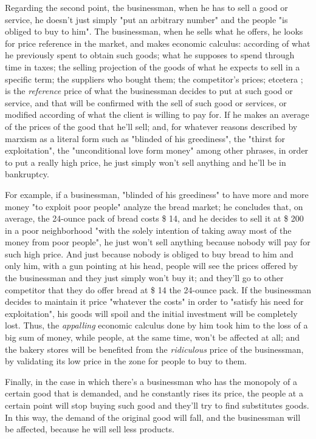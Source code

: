 \documentclass[12pt,a4paper,twoside]{book}
\begin{document}
Regarding the second point, the businessman, when he has to sell a good or service, he doesn't just simply "put an arbitrary number" and the people "is obliged to buy to him". The businessman, when he sells what he offers, he looks for price reference in the market, and makes economic calculus: according of what he previously spent to obtain such goods; what he supposes to spend through time in taxes; the selling projection of the goods of what he expects to sell in a specific term; the suppliers who bought them; the competitor's prices; etcetera ; is the \textit{reference} price of what the businessman decides to put at such good or service, and that will be confirmed with the sell of such good or services, or modified according of what the client is willing to pay for. If he makes an average of the prices of the good that he'll sell; and, for whatever reasons described by marxism as a literal form such as "blinded of his greediness", the "thirst for exploitation", the "unconditional love form money" among other phrases, in order to put a really high price, he just simply won't sell anything and he'll be in bankruptcy.

For example, if a businessman, "blinded of his greediness" to have more and more money "to exploit poor people" analyze the bread market; he concludes that, on average, the 24-ounce pack of bread costs \$ 14, and he decides to sell it at \$ 200 in a poor neighborhood "with the solely intention of taking away most of the money from poor people", he just won't sell anything because nobody will pay for such high price. And just because nobody is obliged to buy bread to him and only him, with a gun pointing at his head, people will see the prices offered by the businessman and they just simply won't buy it; and they'll go to other competitor that they do offer bread at \$ 14 the 24-ounce pack. If the businessman decides to maintain it price "whatever the costs" in order to "satisfy his need for exploitation", his goods will spoil and the initial investment will be completely lost. Thus, the \textit{appalling} economic calculus done by him took him to the loss of a big sum of money, while people, at the same time, won't be affected at all; and the bakery stores will be benefited from the \textit{ridiculous} price of the businessman, by validating its low price in the zone for people to buy to them.

Finally, in the case in which there's a businessman who has the monopoly of a certain good that is demanded, and he constantly rises its price, the people at a certain point will stop buying such good and they'll try to find substitutes goods. In this way, the demand of the original good will fall, and the businessman will be affected, because he will sell less products.
\end{document}
